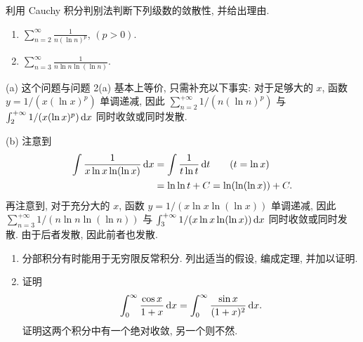 \documentclass{article}
\begin{document}
\begin{problem}
利用 Cauchy 积分判别法判断下列级数的敛散性, 并给出理由.
\begin{enumerate}[label=(\alph*)]
\item $\sum_{n=2}^\infty \frac{1}{n(\ln n)^p}$, $(p>0)$.
\item $\sum_{n=3}^\infty \frac{1}{n\ln n\ln(\ln n)}$.
\end{enumerate}
\end{problem}

\begin{solution}
  (a) 这个问题与问题 2(a) 基本上等价, 只需补充以下事实: 对于足够大的 \( x \), 函数 \( y=1/(x(\ln x)^p) \) 单调递减, 因此 \( \sum_{n=2}^{+\infty}1/(n(\ln n)^p) \) 与 \( \int_{2}^{+\infty}1/(x(\ln x)^p)\,\mathrm{d} x \) 同时收敛或同时发散.

  (b) 注意到
  \begin{align*}
    \int \frac{1}{x\ln x\ln(\ln x)}\,\mathrm{d} x
    &=\int \frac{1}{t\ln t}\,\mathrm{d} t \qquad (t=\ln x) \\
    &=\ln \ln t + C = \ln(\ln(\ln x)) + C.
  \end{align*}
  再注意到, 对于充分大的 \( x \), 函数 \( y=1/(x\ln x\ln(\ln x)) \) 单调递减, 因此 \( \sum_{n=3}^{+\infty}1/(n\ln n\ln(\ln n)) \) 与 \( \int_{3}^{+\infty}1/(x\ln x\ln(\ln x))\,\mathrm{d} x \) 同时收敛或同时发散. 由于后者发散, 因此前者也发散.
  
\end{solution}



\begin{problem}
\begin{enumerate}[label=(\alph*)]
\item 分部积分有时能用于无穷限反常积分. 列出适当的假设, 编成定理, 并加以证明.
\item 证明
\[
\int_0^\infty \frac{\cos x}{1+x}\,\mathrm{d} x = \int_0^\infty \frac{\sin x}{(1+x)^2}\,\mathrm{d} x.
\]
证明这两个积分中有一个绝对收敛, 另一个则不然.
\end{enumerate}
\end{problem}
\end{document}
